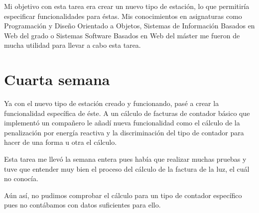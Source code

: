 Mi objetivo con esta tarea era crear un nuevo tipo de estación, lo que permitiría especificar funcionalidades para éstas. Mis conocimientos en asignaturas como Programación y Diseño Orientado a Objetos, Sistemas de Información Basados en Web del grado o Sistemas Software Basados en Web del máster me fueron de mucha utilidad para llevar a cabo esta tarea.

\section{Cuarta semana}

Ya con el nuevo tipo de estación creado y funcionando, pasé a crear la funcionalidad específica de éste. A un cálculo de facturas de contador básico que implementó un compañero le añadí nueva funcionalidad como el cálculo de la penalización por energía reactiva y la discriminación del tipo de contador para hacer de una forma u otra el cálculo.

Esta tarea me llevó la semana entera pues había que realizar muchas pruebas y tuve que entender muy bien el proceso del cálculo de la factura de la luz, el cuál no conocía.

Aún así, no pudimos comprobar el cálculo para un tipo de contador específico pues no contábamos con datos suficientes para ello.